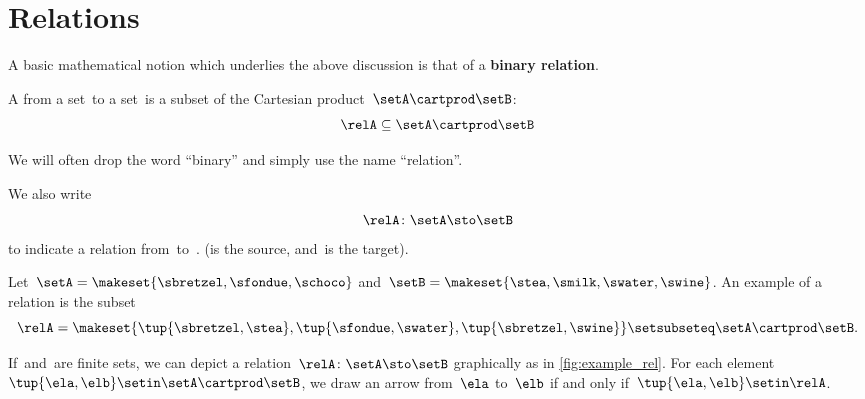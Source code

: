 
\section{Relations}
\label{sec:connection-relations}

A basic mathematical notion which underlies the above discussion is that of a \textbf{binary relation}.

\begin{ctdefinition}
    \label{def:binary-relation}
    A \emph{} \relA from a set~\setA to a set~\setB is a subset of the Cartesian product~$\setA\cartprod \setB$:
    \begin{equation}
        \relA \subseteq \setA \cartprod \setB
    \end{equation}
\end{ctdefinition}

We will often drop the word ``binary'' and simply use the name ``relation''.

We also write
\begin{equation}
    \relA \colon \setA \sto \setB
\end{equation}
to indicate a relation from~\setA to~\setB.
(\setA is the source, and~\setB is the target).

\begin{marginfigure}
    \centering
    \caption{}
    \label{fig:example_rel}
\end{marginfigure}

\begin{example}
    \label{exa:simple-rel}
    Let~$\setA = \makeset{ \sbretzel, \sfondue, \schoco}$ and~$\setB = \makeset{ \stea, \smilk, \swater, \swine }$.
    An example of a relation is the subset
    \begin{equation}
        \relA = \makeset{ \tup{\sbretzel, \stea}, \tup{\sfondue, \swater}, \tup{\sbretzel, \swine} } \setsubseteq \setA \cartprod \setB.
    \end{equation}
\end{example}

If~\setA and~\setB are finite sets, we can depict a relation~$\relA \colon \setA \sto \setB$ graphically as in \cref{fig:example_rel}.
For each element~$\tup{\ela,\elb} \setin \setA \cartprod \setB$, we draw an arrow from~$\ela$ to~$\elb$ if and only if~$\tup{\ela,\elb} \setin \relA$.

